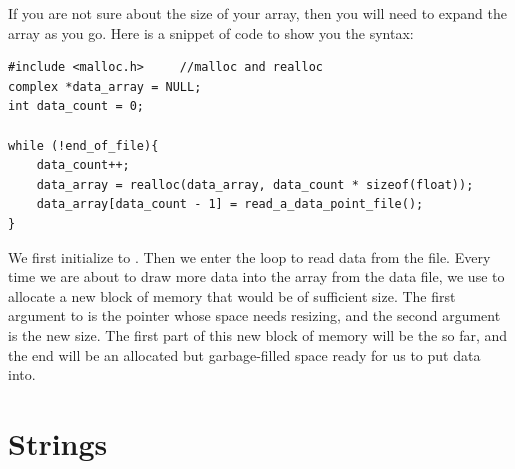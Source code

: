 If you are not sure about the size of your array, then you will need to
expand the array as you go. Here is a snippet of code to show you the syntax:
\begin{lstlisting}
#include <malloc.h>     //malloc and realloc
complex *data_array = NULL;
int data_count = 0;

while (!end_of_file){
    data_count++;
    data_array = realloc(data_array, data_count * sizeof(float));
    data_array[data_count - 1] = read_a_data_point_file();
}
\end{lstlisting}

We first initialize  to .
Then
we enter the loop to read data from the file. Every time we are about to draw
more data into the array from the data file, we use  to
allocate a new block of memory that would be of sufficient size. The first
argument to  is the pointer whose space needs resizing,
and the second argument is the new size.  The first part of this new
block of memory will be the  so far, and the end will
be an allocated but garbage-filled space ready for us to put data into.


\section{Strings}  \label{stringsec}

